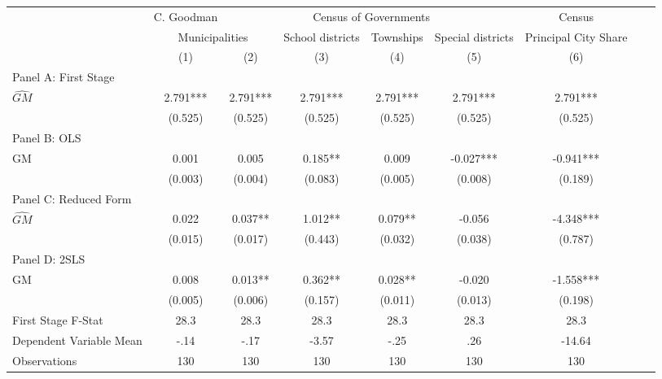  \begin{tabular}{l*{8}{c}} \toprule
&\multicolumn{1}{c}{C. Goodman}&\multicolumn{4}{c}{Census of Governments}&\multicolumn{1}{c}{Census}\\\cmidrule(lr){2-2}\cmidrule(lr){3-6}\cmidrule(lr){7-7}
&\multicolumn{2}{c}{Municipalities}&\multicolumn{1}{c}{School districts}&\multicolumn{1}{c}{Townships}&\multicolumn{1}{c}{Special districts}&\multicolumn{1}{c}{Principal City Share}\\\cmidrule(lr){2-3}\cmidrule(lr){4-6}\cmidrule(lr){7-7}
&\multicolumn{1}{c}{(1)}&\multicolumn{1}{c}{(2)}&\multicolumn{1}{c}{(3)}&\multicolumn{1}{c}{(4)}&\multicolumn{1}{c}{(5)}&\multicolumn{1}{c}{(6)}\\
\cmidrule(lr){1-7}
\multicolumn{6}{l}{Panel A: First Stage}\\
\cmidrule(lr){1-7}
$\widehat{GM}$  &    2.791***&    2.791***&    2.791***&    2.791***&    2.791***&    2.791***\\
                &  (0.525)   &  (0.525)   &  (0.525)   &  (0.525)   &  (0.525)   &  (0.525)   \\
\cmidrule(lr){1-7}
\multicolumn{6}{l}{Panel B: OLS}\\
\cmidrule(lr){1-7}
GM              &    0.001   &    0.005   &    0.185** &    0.009   &   -0.027***&   -0.941***\\
                &  (0.003)   &  (0.004)   &  (0.083)   &  (0.005)   &  (0.008)   &  (0.189)   \\
\cmidrule(lr){1-7}
\multicolumn{6}{l}{Panel C: Reduced Form}\\
\cmidrule(lr){1-7}
$\widehat{GM}$  &    0.022   &    0.037** &    1.012** &    0.079** &   -0.056   &   -4.348***\\
                &  (0.015)   &  (0.017)   &  (0.443)   &  (0.032)   &  (0.038)   &  (0.787)   \\
\cmidrule(lr){1-7}
\multicolumn{6}{l}{Panel D: 2SLS}\\
\cmidrule(lr){1-7}
GM              &    0.008   &    0.013** &    0.362** &    0.028** &   -0.020   &   -1.558***\\
                &  (0.005)   &  (0.006)   &  (0.157)   &  (0.011)   &  (0.013)   &  (0.198)   \\
\midrule
First Stage F-Stat&     28.3   &     28.3   &     28.3   &     28.3   &     28.3   &     28.3   \\
Dependent Variable Mean&     -.14   &     -.17   &    -3.57   &     -.25   &      .26   &   -14.64   \\
Observations    &      130   &      130   &      130   &      130   &      130   &      130   \\
       \bottomrule \end{tabular}
